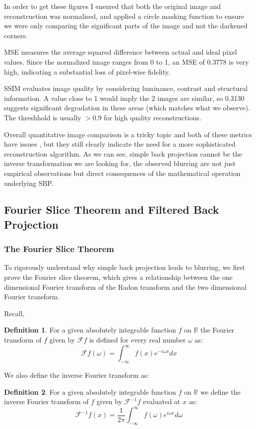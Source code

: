 \documentclass{article}
\theoremstyle{definition}
\newtheorem{definition}{Definition}[section]
\begin{document}
In order to get these figures I ensured that both the original image and reconstruction was normalised, and applied a circle masking function to ensure we were only comparing the significant parts of the image and not the darkened corners.

MSE measures the average squared difference between actual and ideal pixel values. Since the normalized image ranges from 0 to 1, an MSE of 0.3778 is very high, indicating a substantial loss of pixel-wise fidelity.

SSIM evaluates image quality by considering luminance, contrast and structural information. A value close to 1 would imply the 2 images are similar, so 0.3130 suggests significant degradation in these areas (which matches what we observe). The threshhold is usually $> 0.9$ for high quality reconstructions.

Overall quantitative image comparison is a tricky topic and both of these metrics have issues \cite{Nilsson2020}, but they still clearly indicate the need for a more sophisticated reconstruction algorithm. As we can see, simple back projection cannot be the inverse transformation we are looking for, the observed blurring are not just empirical observations but direct consequences of the mathematical operation underlying SBP.

\subsection{Fourier Slice Theorem and Filtered Back Projection}
\subsubsection{The Fourier Slice Theorem}
To rigorously understand why simple back projection leads to blurring, we first prove the Fourier slice theorem, which gives a relationship between the one dimensional Fourier transform of the Radon transform and the two dimensional Fourier transform.

Recall,
\begin{definition}
For a given absolutely integrable function $f$ on $\mathbb{R}$ the Fourier transform of $f$ given by $\mathcal{F}f$ is defined for every real number $\omega$ as:
$$
\mathcal{F}f(\omega) = \int_{-\infty}^{\infty} f(x) e^{- i \omega x}dx
$$
\end{definition}

We also define the inverse Fourier transform as:

\begin{definition}
For a given absolutely integrable function $f$ on $\mathbb{R}$ we define the inverse Fourier transform of $f$ given by $\mathcal{F}^{-1}f$ evaluated at $x$ as:
$$
\mathcal{F}^{-1}f(x) = \frac{1}{2 \pi} \int_{-\infty}^{\infty} f(\omega) e^{i \omega x}d\omega
$$
\end{definition}
\end{document}
